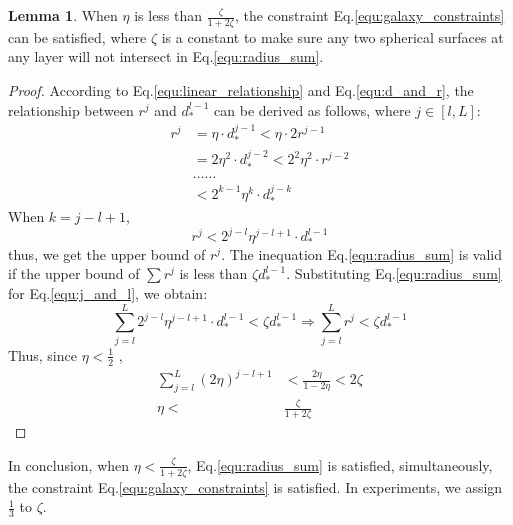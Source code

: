 \documentclass{article}
\theoremstyle{definition}
\newtheorem{lem}{Lemma}
\begin{document}
	 \begin{lem}
	 \label{prf:eta}
	 	When $\eta$ is less than $\frac{\zeta}{1+2\zeta}$, the constraint Eq.\ref{equ:galaxy_constraints} can be satisfied, where $\zeta$ is a constant to make sure any two spherical surfaces at any layer will not intersect in Eq.\ref{equ:radius_sum}. 
	 \end{lem}
	 \begin{proof} 
	 	According to Eq.\ref{equ:linear_relationship} and Eq.\ref{equ:d_and_r}, the relationship between $r^j$ and $d_*^{l-1}$ can be derived as follows, where $j \in [l, L]$:	
	 	\begin{align}
	 	\label{equ:derivation}
	 		\nonumber
	 		r^j &= \eta \cdot d_*^{j-1} < \eta \cdot 2r^{j-1} \\
	 		\nonumber
	 		&= 2\eta^2 \cdot d_*^{j-2} < 2^2\eta^2 \cdot r^{j-2} \\
	 		\nonumber
	 		&... ...\\
	 		&< 2^{k-1}\eta^k \cdot d_*^{j-k}
	 	\end{align}
	 	When $k=j-l+1$, 
	 	\begin{equation}
	 		\label{equ:j_and_l}
	 		r^j < 2^{j-l}\eta^{j-l+1} \cdot d_*^{l-1}
	 	\end{equation}
	 	thus, we get the upper bound of $r^j$. The inequation Eq.\ref{equ:radius_sum} is valid if the upper bound of $\sum r^j$ is less than $\zeta d_*^{l-1}$. Substituting Eq.\ref{equ:radius_sum} for Eq.\ref{equ:j_and_l}, we obtain:
	 	\begin{equation}
	 	\nonumber
	 	\sum_{j=l}^L 2^{j-l} \eta^{j-l+1} \cdot d_*^{l-1} < \zeta d_*^{l-1} \Rightarrow \sum_{j=l}^L r^j < \zeta d_*^{l-1} 
	 	\end{equation}
	 	Thus, since $\eta < \frac{1}{2}$ , 
	 	\begin{align}
	 	\nonumber
	 	\sum_{j=l}^L (2\eta)^{j-l+1}& < \frac{2\eta}{1-2\eta}< 2 \zeta \\
	 	\nonumber
	 	\eta <& \frac{\zeta}{1+2\zeta}
	 	\end{align}
	 \end{proof}
	 In conclusion, when $\eta < \frac{\zeta}{1+2\zeta}$, Eq.\ref{equ:radius_sum} is satisfied, simultaneously, the constraint Eq.\ref{equ:galaxy_constraints} is satisfied. In experiments, we assign $\frac{1}{3}$ to $\zeta$.
	 
\end{document}
